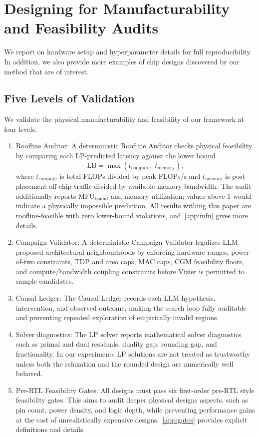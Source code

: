 \newpage
\section{Designing for Manufacturability and Feasibility Audits}
\label{app:details}
We report on hardware setup and hyperparameter details for full reproducibility. In addition, we also provide more examples of chip designs discovered by our method that are of interest. 


\subsection{Five Levels of Validation}
\label{app:validation}
We validate the physical manufacturability and feasibility of our framework at four levels.

\begin{enumerate}
    \item Roofline Auditor: A deterministic Roofline Auditor checks physical feasibility by comparing
each LP-predicted latency against the lower bound
\begin{equation}
    \mathrm{LB} = \max\!\left(t_{\mathrm{compute}},\;
    t_{\mathrm{memory}}\right),
\end{equation}
where $t_{\mathrm{compute}}$ is total FLOPs divided by peak FLOPs/s and
$t_{\mathrm{memory}}$ is post-placement off-chip traffic divided by
available memory bandwidth.
The audit additionally reports $\mathrm{MFU}_{\mathrm{bound}}$ and memory
utilization; values above 1 would indicate a physically impossible
prediction.
All results withing this paper are roofline-feasible with zero lower-bound violations, and~\cref{app:mfu} gives more details.

\item Campaign Validator: A deterministic Campaign Validator legalizes LLM-proposed architectural
neighbourhoods by enforcing hardware ranges, power-of-two constraints,
TDP and area caps, MAC caps, CGM feasibility floors, and
compute/bandwidth coupling constraints before Vizier is permitted to
sample candidates.
\item Causal Ledger:
The Causal Ledger records each LLM hypothesis, intervention, and observed
outcome, making the search loop fully auditable and preventing repeated
exploration of empirically invalid regions.
\item Solver diagnostics:
The LP solver reports mathematical solver diagnostics such as primal and dual
residuals, duality gap, rounding gap, and fractionality. 
In our experiments LP solutions are not treated as trustworthy unless both the relaxation and the rounded design are numerically well behaved.
\item Pre-RTL Feasibility Gates: All designs must pass six first-order pre-RTL style feasibility gates. This aims to audit deeper physical designs aspects, such as pin count, power density, and logic depth, while preventing performance gains at the cost of unrealistically expensive designs.~\cref{app:gates} provides explicit definitions and details.
\end{enumerate}


